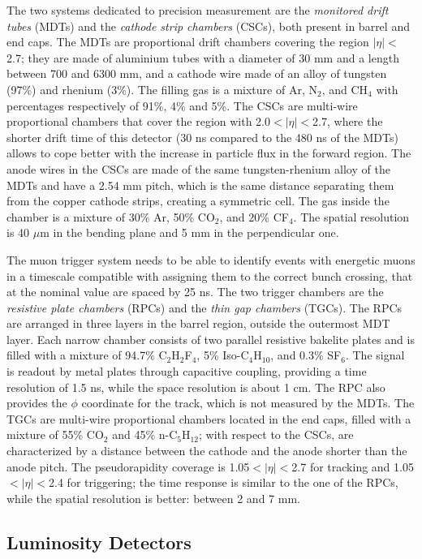 The two systems dedicated to precision measurement are the \textit{monitored drift tubes} (MDTs)  and the \textit{cathode strip chambers} (CSCs), both present in barrel and end caps. The MDTs are proportional drift chambers covering the region $|\eta|<$2.7; they are made of aluminium tubes with a diameter of 30 mm and a length between 700 and 6300 mm, and a cathode wire made of an alloy of tungsten (97\%) and rhenium (3\%). The filling gas is a mixture of Ar, N$_2$, and CH$_4$ with percentages respectively of 91\%, 4\% and 5\%. The CSCs are multi-wire proportional chambers that cover the region with 2.0$<|\eta|<$2.7, where the shorter drift time of this detector (30 ns compared to the 480 ns of the MDTs) allows to cope better with the increase in particle flux in the forward region. The anode wires in the CSCs are made of the same tungsten-rhenium alloy of the MDTs and have a 2.54 mm pitch, which is the same distance separating them from the copper cathode strips, creating a symmetric cell. The gas inside the chamber is a mixture of 30\% Ar, 50\% CO$_2$, and 20\% CF$_4$. The spatial resolution is 40 $\mu$m in the bending plane and 5 mm in the perpendicular one.

The muon trigger system needs to be able to identify events with energetic muons in a timescale compatible with assigning them to the correct bunch crossing, that at the nominal value are spaced by 25 ns. The two trigger chambers are the \textit{resistive plate chambers} (RPCs) and the \textit{thin gap chambers} (TGCs). The RPCs are arranged in three layers in the barrel region, outside the outermost MDT layer. Each narrow chamber consists of two parallel resistive bakelite plates and is filled with a mixture of 94.7\% C$_2$H$_2$F$_4$, 5\% Iso-C$_4$H$_{10}$, and 0.3\% SF$_6$. The signal is readout by metal plates through capacitive coupling, providing a time resolution of 1.5 ns, while the space resolution is about 1 cm. The RPC also provides the $\phi$ coordinate for the track, which is not measured by the MDTs. The TGCs are multi-wire proportional chambers located in the end caps, filled with a mixture of 55\% CO$_2$ and 45\% n-C$_5$H$_{12}$; with respect to the CSCs, are characterized by a distance between the cathode and the anode shorter than the anode pitch. The pseudorapidity coverage is 1.05$<|\eta|<$2.7 for tracking and 1.05$<|\eta|<$2.4 for triggering; the time response is similar to the one of the RPCs, while the spatial resolution is better: between 2 and 7 mm. 

\subsection{Luminosity Detectors}

